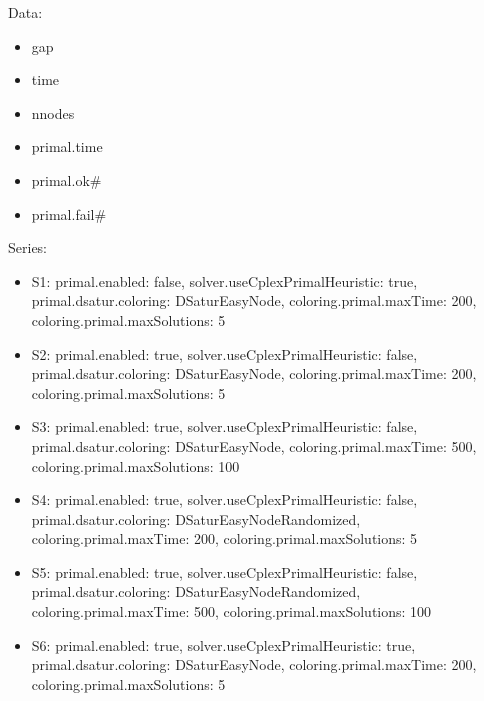 \documentclass[landscape, 12pt]{report}
\begin{document}
Data:
\begin{itemize}
\item gap
\item time
\item nnodes
\item primal.time
\item primal.ok\#
\item primal.fail\#
\end{itemize}
Series:
\begin{itemize}
\item S1: primal.enabled: false, solver.useCplexPrimalHeuristic: true, primal.dsatur.coloring: DSaturEasyNode, coloring.primal.maxTime: 200, coloring.primal.maxSolutions: 5
\item S2: primal.enabled: true, solver.useCplexPrimalHeuristic: false, primal.dsatur.coloring: DSaturEasyNode, coloring.primal.maxTime: 200, coloring.primal.maxSolutions: 5
\item S3: primal.enabled: true, solver.useCplexPrimalHeuristic: false, primal.dsatur.coloring: DSaturEasyNode, coloring.primal.maxTime: 500, coloring.primal.maxSolutions: 100
\item S4: primal.enabled: true, solver.useCplexPrimalHeuristic: false, primal.dsatur.coloring: DSaturEasyNodeRandomized, coloring.primal.maxTime: 200, coloring.primal.maxSolutions: 5
\item S5: primal.enabled: true, solver.useCplexPrimalHeuristic: false, primal.dsatur.coloring: DSaturEasyNodeRandomized, coloring.primal.maxTime: 500, coloring.primal.maxSolutions: 100
\item S6: primal.enabled: true, solver.useCplexPrimalHeuristic: true, primal.dsatur.coloring: DSaturEasyNode, coloring.primal.maxTime: 200, coloring.primal.maxSolutions: 5
\end{itemize}
\end{document}
